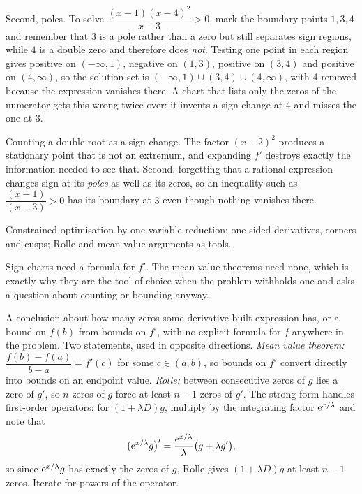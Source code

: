 Second, poles. To solve $\dfrac{(x-1)(x-4)^{2}}{x-3}>0$, mark the boundary points $1,3,4$ and remember that $3$ is a pole rather than a zero but still separates sign regions, while $4$ is a double zero and therefore does \emph{not}. Testing one point in each region gives positive on $(-\infty,1)$, negative on $(1,3)$, positive on $(3,4)$ and positive on $(4,\infty)$, so the solution set is $(-\infty,1)\cup(3,4)\cup(4,\infty)$, with $4$ removed because the expression vanishes there. A chart that lists only the zeros of the numerator gets this wrong twice over: it invents a sign change at $4$ and misses the one at $3$.

\begin{trap}
Counting a double root as a sign change. The factor $(x-2)^{2}$ produces a stationary point that is not an extremum, and expanding $f'$ destroys exactly the information needed to see that. Second, forgetting that a rational expression changes sign at its \emph{poles} as well as its zeros, so an inequality such as $\dfrac{(x-1)}{(x-3)}>0$ has its boundary at $3$ even though nothing vanishes there.
\end{trap}

\begin{seealsob}Constrained optimisation by one-variable reduction; one-sided derivatives, corners and cusps; Rolle and mean-value arguments as tools.\end{seealsob}

Sign charts need a formula for $f'$. The mean value theorems need none, which is exactly why they are the tool of choice when the problem withholds one and asks a question about counting or bounding anyway.

\cue A conclusion about how many zeros some derivative-built expression has, or a bound on $f(b)$ from bounds on $f'$, with no explicit formula for $f$ anywhere in the problem.
\method Two statements, used in opposite directions. \emph{Mean value theorem:} $\dfrac{f(b)-f(a)}{b-a}=f'(c)$ for some $c\in(a,b)$, so bounds on $f'$ convert directly into bounds on an endpoint value. \emph{Rolle:} between consecutive zeros of $g$ lies a zero of $g'$, so $n$ zeros of $g$ force at least $n-1$ zeros of $g'$. The strong form handles first-order operators: for $(1+\lambda D)g$, multiply by the integrating factor $\mathrm{e}^{x/\lambda}$ and note that
\[
\bigl(\mathrm{e}^{x/\lambda}g\bigr)'=\frac{\mathrm{e}^{x/\lambda}}{\lambda}\bigl(g+\lambda g'\bigr),
\]
so since $\mathrm{e}^{x/\lambda}g$ has exactly the zeros of $g$, Rolle gives $(1+\lambda D)g$ at least $n-1$ zeros. Iterate for powers of the operator.

